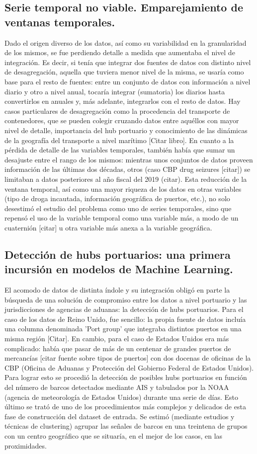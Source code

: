 \documentclass{article}
\begin{document}
\subsection{Serie temporal no viable. Emparejamiento de ventanas temporales.}
Dado el origen diverso de los datos, así como su variabilidad en la granularidad de los mismos, se fue perdiendo detalle a medida que aumentaba el nivel de integración. Es decir, si tenía que integrar dos fuentes de datos con distinto nivel de desagregación, aquella que tuviera menor nivel de la misma, se usaría como base para el resto de fuentes: entre un conjunto de datos con información a nivel diario y otro a nivel anual, tocaría integrar (sumatoria) los diarios hasta convertirlos en anuales y, más adelante, integrarlos con el resto de datos. Hay casos particulares de desagregación como la procedencia del transporte de contenedores, que se pueden colegir cruzando datos entre aquéllos con mayor nivel de detalle, importancia del hub portuario y conocimiento de las dinámicas de la geografía del transporte a nivel marítimo [Citar libro]. En cuanto a la pérdida de detalle de las variables temporales, también había que sumar un desajuste entre el rango de los mismos: mientras unos conjuntos de datos proveen información de las últimas dos décadas, otros (caso CBP drug seizures [citar]) se limitaban a datos posteriores al año fiscal del 2019 (citar). Esta reducción de la ventana temporal, así como una mayor riqueza de los datos en otras variables (tipo de droga incautada, información geográfica de puertos, etc.), no solo desestimó el estudio del problema como uno de series temporales, sino que repensó el uso de la variable temporal como una variable más, a modo de un cuaternión [citar] u otra variable más anexa a la variable geográfica.

\subsection{Detección de hubs portuarios: una primera incursión en modelos de Machine Learning.}
El acomodo de datos de distinta índole y su integración obligó en parte la búsqueda de una solución de compromiso entre los datos a nivel portuario y las jurisdicciones de agencias de aduanas: la detección de hubs portuarios. Para el caso de los datos de Reino Unido, fue sencillo: la propia fuente de datos incluía una columna denominada 'Port group' que integraba distintos puertos en una misma región [Citar]. En cambio, para el caso de Estados Unidos era más complicado: había que pasar de más de un centenar de grandes puertos de mercancías [citar fuente sobre tipos de puertos] con dos docenas de oficinas de la CBP (Oficina de Aduanas y Protección del Gobierno Federal de Estados Unidos). Para lograr esto se procedió la detección de posibles hubs portuarios en función del número de barcos detectados mediante AIS y tabulados por la NOAA (agencia de meteorología de Estados Unidos) durante una serie de días. Esto último se trató de uno de los procedimientos más complejos y delicados de esta fase de construcción del dataset de entrada. Se estimó (mediante estudios y técnicas de clustering) agrupar las señales de barcos en una treintena de grupos con un centro geográfico que se situaría, en el mejor de los casos, en las proximidades.
\end{document}
